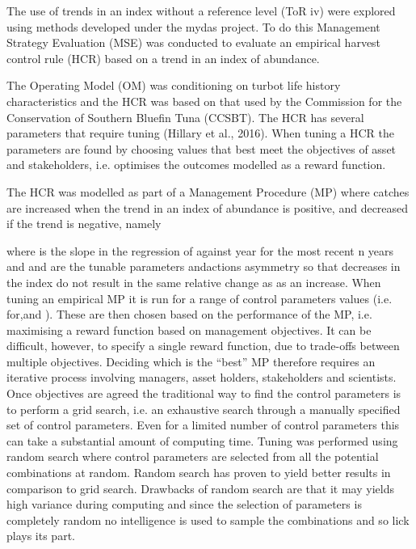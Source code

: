 \documentclass[12pt,doublespacing,a4paper]{ouparticle}
\begin{document}
The use of trends in an index without a reference level (ToR iv) were explored using methods developed under the mydas project.  To do this Management Strategy Evaluation (MSE) was conducted to evaluate an empirical harvest control rule (HCR) based on a trend in an index of abundance. 

The  Operating Model (OM) was conditioning on turbot life history characteristics and the HCR was based on that used by the Commission for the Conservation of Southern Bluefin Tuna (CCSBT). The HCR has several parameters that require tuning (Hillary et al., 2016). When tuning a HCR the parameters are found by choosing values that best meet the objectives of  asset and stakeholders, i.e. optimises the outcomes modelled as a reward function. 

The HCR was modelled as part of a  Management Procedure (MP) where catches are increased when the trend in an index of abundance is positive, and decreased if the trend is negative, namely

where  is the slope in the regression of  against year for the most recent n years and  and  are  the tunable parameters andactions asymmetry so that decreases in the index do not result in the same relative change as as an increase.
When tuning an empirical MP it is run for a range of control parameters values (i.e. for,and ). These are then chosen based on the performance of the MP, i.e.  maximising a reward function based on management objectives. It can be difficult, however, to specify a single reward function, due to trade-offs between multiple objectives. Deciding which is the “best” MP therefore requires an iterative process involving managers, asset holders, stakeholders and scientists.
Once objectives are agreed the traditional way to find the control parameters is to perform  a grid search, i.e. an exhaustive search through a manually specified set of control parameters. Even for a limited number of control parameters this can take a substantial amount of computing time. Tuning was performed using random search where control parameters are selected from all the potential combinations at random.  Random search has proven to yield better results in comparison to grid search. Drawbacks of random search are that it may yields high variance during computing and since the selection of parameters is completely random no intelligence is used to sample the combinations and so lick plays its part. 
\end{document}
